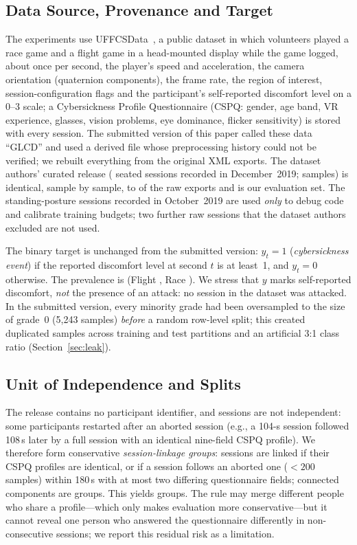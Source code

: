 \subsection{Data Source, Provenance and Target}
\label{sec:data}
The experiments use UFFCSData~\cite{porcino2019uffcsdata,porcino2022identifying,porcino2021methodology}, a public dataset in which volunteers played a race game and a flight game in a head-mounted display while the game logged, about once per second, the player's speed and acceleration, the camera orientation (quaternion components), the frame rate, the region of interest, session-configuration flags and the participant's self-reported discomfort level on a 0--3 scale; a Cybersickness Profile Questionnaire (CSPQ: gender, age band, VR experience, glasses, vision problems, eye dominance, flicker sensitivity) is stored with every session. The submitted version of this paper called these data ``GLCD'' and used a derived file whose preprocessing history could not be verified; we rebuilt everything from the original XML exports. The dataset authors' curated release (\nSessionsEval{} seated sessions recorded in December~2019; \nSamplesEval{} samples) is identical, sample by sample, to \nSessionsEval{} of the raw exports and is our evaluation set. The \nSessionsDev{} standing-posture sessions recorded in October~2019 are used \emph{only} to debug code and calibrate training budgets; two further raw sessions that the dataset authors excluded are not used.

The binary target is unchanged from the submitted version: $y_t=1$ (\emph{cybersickness event}) if the reported discomfort level at second $t$ is at least~1, and $y_t=0$ otherwise. The prevalence is \prevEval{} (Flight \prevFlight{}, Race \prevRace{}). We stress that $y$ marks self-reported discomfort, \emph{not} the presence of an attack: no session in the dataset was attacked. In the submitted version, every minority grade had been oversampled to the size of grade~0 (5,243 samples) \emph{before} a random row-level split; this created duplicated samples across training and test partitions and an artificial 3:1 class ratio (Section~\ref{sec:leak}).

\subsection{Unit of Independence and Splits}
\label{sec:groups}
The release contains no participant identifier, and sessions are not independent: some participants restarted after an aborted session (e.g., a 104-s session followed 108\,s later by a full session with an identical nine-field CSPQ profile). We therefore form conservative \emph{session-linkage groups}: sessions are linked if their CSPQ profiles are identical, or if a session follows an aborted one ($<200$ samples) within 180\,s with at most two differing questionnaire fields; connected components are groups. This yields \nGroupsEval{} groups. The rule may merge different people who share a profile---which only makes evaluation more conservative---but it cannot reveal one person who answered the questionnaire differently in non-consecutive sessions; we report this residual risk as a limitation.


